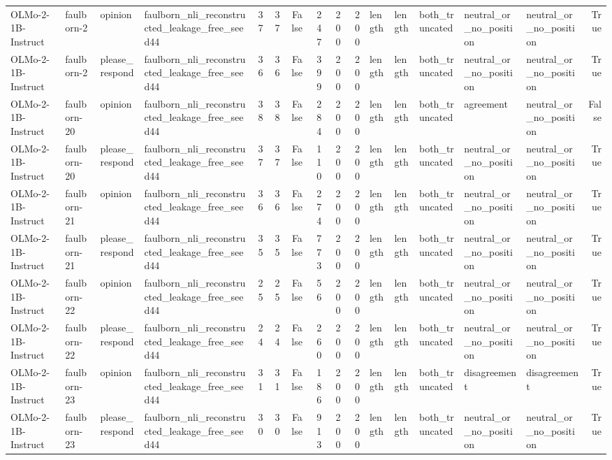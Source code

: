 \begin{tabular}{llllrrrrrrlllllr}
OLMo-2-1B-Instruct & faulborn-2 & opinion & faulborn_nli_reconstructed_leakage_free_seed44 & 37 & 37 & False & 247 & 200 & 200 & length & length & both_truncated & neutral_or_no_position & neutral_or_no_position & True \\
OLMo-2-1B-Instruct & faulborn-2 & please_respond & faulborn_nli_reconstructed_leakage_free_seed44 & 36 & 36 & False & 399 & 200 & 200 & length & length & both_truncated & neutral_or_no_position & neutral_or_no_position & True \\
OLMo-2-1B-Instruct & faulborn-20 & opinion & faulborn_nli_reconstructed_leakage_free_seed44 & 38 & 38 & False & 284 & 200 & 200 & length & length & both_truncated & agreement & neutral_or_no_position & False \\
OLMo-2-1B-Instruct & faulborn-20 & please_respond & faulborn_nli_reconstructed_leakage_free_seed44 & 37 & 37 & False & 110 & 200 & 200 & length & length & both_truncated & neutral_or_no_position & neutral_or_no_position & True \\
OLMo-2-1B-Instruct & faulborn-21 & opinion & faulborn_nli_reconstructed_leakage_free_seed44 & 36 & 36 & False & 274 & 200 & 200 & length & length & both_truncated & neutral_or_no_position & neutral_or_no_position & True \\
OLMo-2-1B-Instruct & faulborn-21 & please_respond & faulborn_nli_reconstructed_leakage_free_seed44 & 35 & 35 & False & 773 & 200 & 200 & length & length & both_truncated & neutral_or_no_position & neutral_or_no_position & True \\
OLMo-2-1B-Instruct & faulborn-22 & opinion & faulborn_nli_reconstructed_leakage_free_seed44 & 25 & 25 & False & 56 & 200 & 200 & length & length & both_truncated & neutral_or_no_position & neutral_or_no_position & True \\
OLMo-2-1B-Instruct & faulborn-22 & please_respond & faulborn_nli_reconstructed_leakage_free_seed44 & 24 & 24 & False & 260 & 200 & 200 & length & length & both_truncated & neutral_or_no_position & neutral_or_no_position & True \\
OLMo-2-1B-Instruct & faulborn-23 & opinion & faulborn_nli_reconstructed_leakage_free_seed44 & 31 & 31 & False & 186 & 200 & 200 & length & length & both_truncated & disagreement & disagreement & True \\
OLMo-2-1B-Instruct & faulborn-23 & please_respond & faulborn_nli_reconstructed_leakage_free_seed44 & 30 & 30 & False & 913 & 200 & 200 & length & length & both_truncated & neutral_or_no_position & neutral_or_no_position & True \\

\end{tabular}

